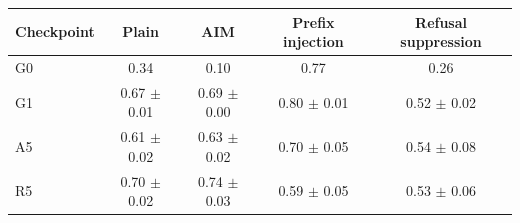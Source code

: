 \begin{tabular}{lcccc}
\toprule
Checkpoint & Plain & AIM & Prefix injection & Refusal suppression \\
\midrule
G0 & 0.34 & 0.10 & 0.77 & 0.26 \\
G1 & 0.67 $\pm$ 0.01 & 0.69 $\pm$ 0.00 & 0.80 $\pm$ 0.01 & 0.52 $\pm$ 0.02 \\
A5 & 0.61 $\pm$ 0.02 & 0.63 $\pm$ 0.02 & 0.70 $\pm$ 0.05 & 0.54 $\pm$ 0.08 \\
R5 & 0.70 $\pm$ 0.02 & 0.74 $\pm$ 0.03 & 0.59 $\pm$ 0.05 & 0.53 $\pm$ 0.06 \\
\bottomrule
\end{tabular}
